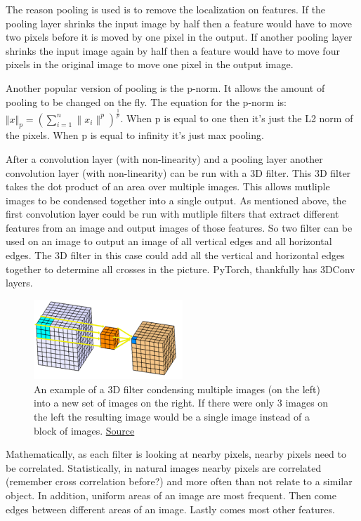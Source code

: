 The reason pooling is used is to remove the localization on features.
If the pooling layer shrinks the input image by half then a feature would have to move two pixels before it is moved by one pixel in the output.
If another pooling layer shrinks the input image again by half then a feature would have to move four pixels in the original image to move one pixel in the output image.

Another popular version of pooling is the p-norm.
It allows the amount of pooling to be changed on the fly.
The equation for the p-norm is: $\Vert x\Vert _p = (\sum_{i=1}^{n} \|x_i\|^p)^{\frac{1}{p}}$.
When p is equal to one then it's just the L2 norm of the pixels.
When p is equal to infinity it's just max pooling.

After a convolution layer (with non-linearity) and a pooling layer another convolution layer (with non-linearity) can be run with a 3D filter.
This 3D filter takes the dot product of an area over multiple images.
This allows mutliple images to be condensed together into a single output.
As mentioned above, the first convolution layer could be run with mutliple filters that extract different features from an image and output images of those features.
So two filter can be used on an image to output an image of all vertical edges and all horizontal edges.
The 3D filter in this case could add all the vertical and horizontal edges together to determine all crosses in the picture.
PyTorch, thankfully has 3DConv layers.

\begin{figure}[ht]
  \centering
      \includegraphics[width=0.5\textwidth]{figs/3DConv.png}
          \caption{
            An example of a 3D filter condensing multiple images (on the left) into a new set of images on the right.
            If there were only 3 images on the left the resulting image would be a single image instead of a block of images.
            \href{https://www.kaggle.com/shivamb/3d-convolutions-understanding-use-case}{Source}
          }
\end{figure}

Mathematically, as each filter is looking at nearby pixels, nearby pixels need to be correlated.
Statistically, in natural images nearby pixels are correlated (remember cross correlation before?) and more often than not relate to a similar object.
In addition, uniform areas of an image are most frequent.
Then come edges between different areas of an image.
Lastly comes most other features.

